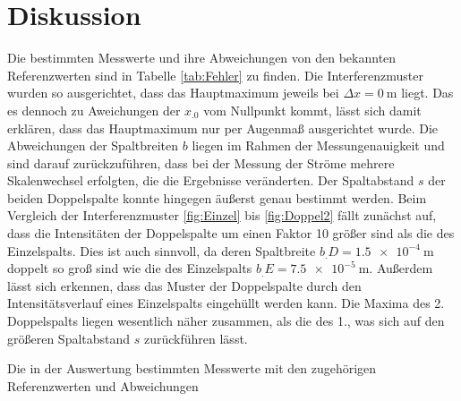 
\section{Diskussion}
\label{sec:Diskussion}

Die bestimmten Messwerte und ihre Abweichungen von den bekannten Referenzwerten sind in Tabelle \ref{tab:Fehler} zu finden.
Die Interferenzmuster wurden so ausgerichtet, dass das Hauptmaximum jeweils bei $\Delta x =\SI{0}{\metre}$ liegt. Das es dennoch zu Aweichungen der $x_.0$ vom Nullpunkt kommt, lässt sich damit erklären, dass das Hauptmaximum nur per Augenmaß ausgerichtet wurde.
Die Abweichungen der Spaltbreiten $b$ liegen im Rahmen der Messungenauigkeit und sind darauf zurückzuführen, dass bei der Messung der Ströme mehrere Skalenwechsel erfolgten, die die Ergebnisse veränderten. 
Der Spaltabstand $s$ der beiden Doppelspalte konnte hingegen äußerst genau bestimmt werden.
Beim Vergleich der Interferenzmuster \ref{fig:Einzel} bis \ref{fig:Doppel2} fällt zunächst auf, dass die Intensitäten der Doppelspalte um einen Faktor 10 größer sind als die des Einzelspalts. Dies ist auch sinnvoll, da deren Spaltbreite $b_.D=\SI{1,5e-4}{\metre}$ doppelt so groß sind wie die des Einzelspalts $b_.E=\SI{7,5e-5}{\metre}$. Außerdem lässt sich erkennen, dass das Muster der Doppelspalte durch den Intensitätsverlauf eines Einzelspalts eingehüllt werden kann.
Die Maxima des 2. Doppelspalts liegen wesentlich näher zusammen, als die des 1., was sich auf den größeren Spaltabstand $s$ zurückführen lässt.

\begin{table}
\centering
\caption{Die in der Auswertung bestimmten Messwerte mit den zugehörigen Referenzwerten und Abweichungen}

\label{tab:Fehler}
\end{table}
